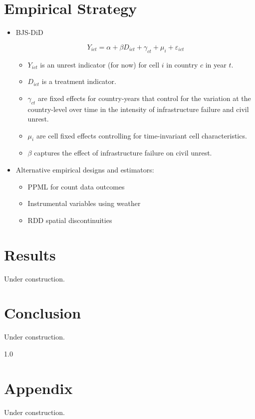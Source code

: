 \documentclass[12pt]{article}
\begin{document}
\section{Empirical Strategy}\label{sec:methods}
\begin{itemize}
    \item BJS-DiD \citep{borusyak2024eventstudy, roth2023didreview}

\begin{equation}
\label{eq:1} Y_{ict} = \alpha + \beta D_{ict} + \gamma_{ct} + \mu_i + \varepsilon_{ict}
\end{equation}

    \begin{itemize}
        \item $Y_{ict}$ is an unrest indicator (for now) for cell $i$ in country $c$ in year $t$.
    
        \item $D_{ict}$ is a treatment indicator.
    
        \item $\gamma_{ct}$ are fixed effects for country-years that control for the variation at the country-level over time in the intensity of infrastructure failure and civil unrest. 
    
        \item  $\mu_i$ are cell fixed effects controlling for time-invariant cell characteristics. 
    
        \item $\beta$ captures the effect of infrastructure failure on civil unrest.
    \end{itemize}

    \item Alternative empirical designs and estimators:
        \begin{itemize}
            \item PPML for count data outcomes
            \item Instrumental variables using weather
            \item RDD spatial discontinuities
        \end{itemize}
\end{itemize}

\section{Results}\label{sec:results}
Under construction.

\section{Conclusion}\label{sec:conclusion}
Under construction.

\pagebreak{}

\vfill
\pagebreak{}
\begin{spacing}{1.0}


\end{spacing}

\pagebreak

\section{Appendix}
Under construction. 

\end{document}
